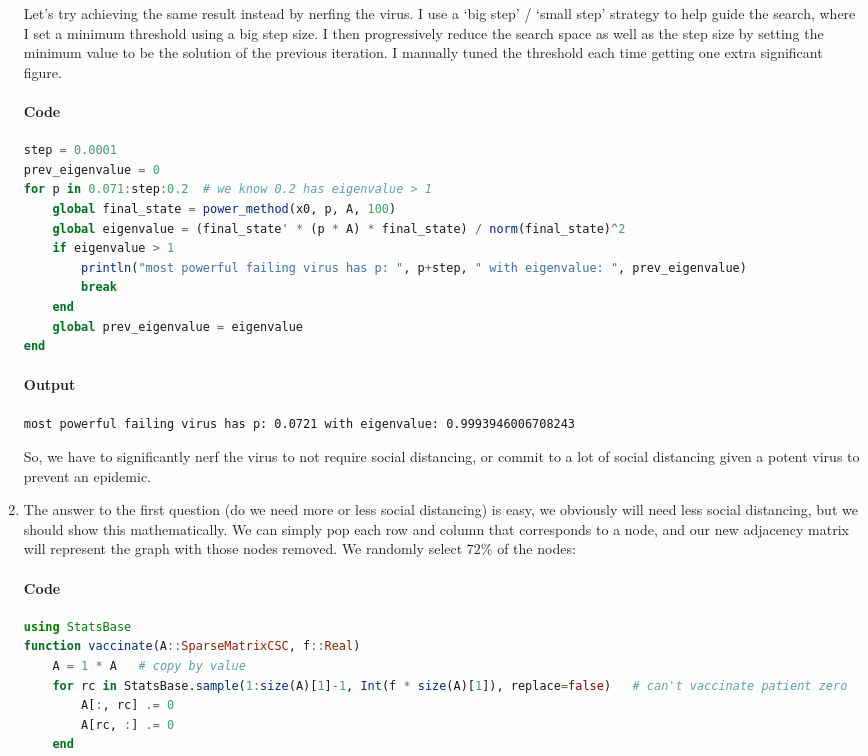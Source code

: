 \documentclass[]{exam}
\let\oldparagraph\paragraph
\renewcommand{\paragraph}[1]{\oldparagraph{#1}\mbox{}}
\begin{document}
\begin{questions}
\begin{enumerate}[label=\arabic*.]
		Let's try achieving the same result instead by nerfing the virus. I use a `big step' / `small step' strategy to help guide the search, where I set a minimum threshold using a big step size. I then progressively reduce the search space as well as the step size by setting the minimum value to be the solution of the previous iteration. I manually tuned the threshold each time getting one extra significant figure.
		\paragraph{Code}
		\begin{lstlisting}[language=julia]
step = 0.0001
prev_eigenvalue = 0
for p in 0.071:step:0.2  # we know 0.2 has eigenvalue > 1
	global final_state = power_method(x0, p, A, 100)
	global eigenvalue = (final_state' * (p * A) * final_state) / norm(final_state)^2
	if eigenvalue > 1
		println("most powerful failing virus has p: ", p+step, " with eigenvalue: ", prev_eigenvalue)
		break
	end
	global prev_eigenvalue = eigenvalue
end
		\end{lstlisting}
		\paragraph{Output}
		\begin{lstlisting}
most powerful failing virus has p: 0.0721 with eigenvalue: 0.9993946006708243
		\end{lstlisting}
		So, we have to significantly nerf the virus to not require social distancing, or commit to a lot of social distancing given a potent virus to prevent an epidemic.
	\item The answer to the first question (do we need more or less social distancing) is easy, we obviously will need less social distancing, but we should show this mathematically. We can simply pop each row and column that corresponds to a node, and our new adjacency matrix will represent the graph with those nodes removed. We randomly select $72\%$ of the nodes:
		\paragraph{Code}
		\begin{lstlisting}[language=julia]
using StatsBase
function vaccinate(A::SparseMatrixCSC, f::Real)
	A = 1 * A   # copy by value
	for rc in StatsBase.sample(1:size(A)[1]-1, Int(f * size(A)[1]), replace=false)   # can't vaccinate patient zero
		A[:, rc] .= 0
		A[rc, :] .= 0
	end


\end{lstlisting}
\end{enumerate}
\end{questions}
\end{document}
